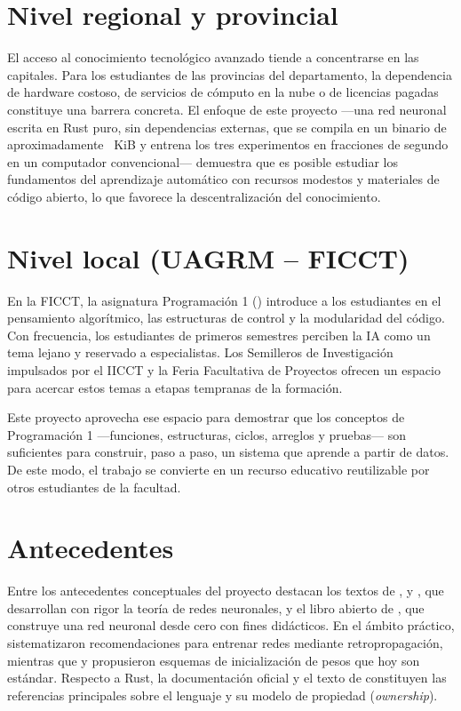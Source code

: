 \section{Nivel regional y provincial}
El acceso al conocimiento tecnológico avanzado tiende a concentrarse en las capitales. Para los estudiantes de las provincias del departamento, la dependencia de hardware costoso, de servicios de cómputo en la nube o de licencias pagadas constituye una barrera concreta. El enfoque de este proyecto ---una red neuronal escrita en Rust puro, sin dependencias externas, que se compila en un binario de aproximadamente \BinKiB{}~KiB y entrena los tres experimentos en fracciones de segundo en un computador convencional--- demuestra que es posible estudiar los fundamentos del aprendizaje automático con recursos modestos y materiales de código abierto, lo que favorece la descentralización del conocimiento.

\section{Nivel local (UAGRM -- FICCT)}
En la FICCT, la asignatura Programación 1 (\Sigla) introduce a los estudiantes en el pensamiento algorítmico, las estructuras de control y la modularidad del código. Con frecuencia, los estudiantes de primeros semestres perciben la IA como un tema lejano y reservado a especialistas. Los Semilleros de Investigación impulsados por el IICCT y la Feria Facultativa de Proyectos ofrecen un espacio para acercar estos temas a etapas tempranas de la formación.

Este proyecto aprovecha ese espacio para demostrar que los conceptos de Programación 1 ---funciones, estructuras, ciclos, arreglos y pruebas--- son suficientes para construir, paso a paso, un sistema que aprende a partir de datos. De este modo, el trabajo se convierte en un recurso educativo reutilizable por otros estudiantes de la facultad.

\section{Antecedentes}
Entre los antecedentes conceptuales del proyecto destacan los textos de \citet{haykin2009}, \citet{bishop2006} y \citet{goodfellow2016}, que desarrollan con rigor la teoría de redes neuronales, y el libro abierto de \citet{nielsen2015}, que construye una red neuronal desde cero con fines didácticos. En el ámbito práctico, \citet{lecun1998} sistematizaron recomendaciones para entrenar redes mediante retropropagación, mientras que \citet{glorot2010} y \citet{he2015} propusieron esquemas de inicialización de pesos que hoy son estándar. Respecto a Rust, la documentación oficial \citep{klabnik2023} y el texto de \citet{blandy2021} constituyen las referencias principales sobre el lenguaje y su modelo de propiedad (\emph{ownership}).
